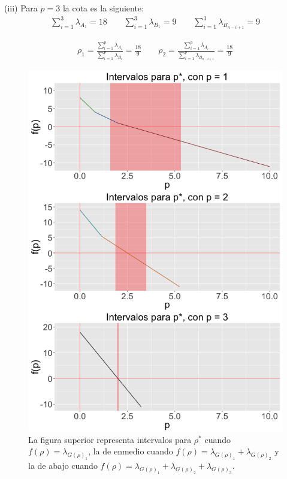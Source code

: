 \begin{example}
(iii) Para $p = 3$ la cota es la siguiente:
\begin{equation*}
  \begin{aligned}
  \sum_{i = 1}^{3}\lambda_{A_1}  = 18 \qquad
  \sum_{i = 1}^{3}\lambda_{B_1}  = 9 \qquad
  \sum_{i = 1}^{3}\lambda_{B_{n-i+1}}  = 9
  \end{aligned}
\end{equation*}

\begin{equation*}
  \begin{aligned}
\rho_1 = \frac{\sum_{i = 1}^{p}\lambda_{A_i}}{\sum_{i = 1}^{p}\lambda_{B_i}}  = \frac{18}{9} \qquad
\rho_2 = \frac{\sum_{i = 1}^{p}\lambda_{A_i}}{\sum_{i = 1}^{p}\lambda_{B_{n-i+1}}}  = \frac{18}{9}
  \end{aligned}
\end{equation*}

\end{example}

\begin{figure}[!ht] \label{Fig1.7}
  \centering
  \includegraphics[width=.9 \textwidth]{Figures/Chapter2_grid3eigen_interv2}  
  \caption[Intervalos para $\rho^*$. (Segunda cota)] {La figura superior representa intervalos para $\rho^*$ cuando $f(\rho) = \lambda_{G(\rho)_1}$, la de enmedio cuando $f(\rho) = \lambda_{G(\rho)_1} + \lambda_{G(\rho)_2}$ y la de abajo cuando $f(\rho) = \lambda_{G(\rho)_1} + \lambda_{G(\rho)_2} + \lambda_{G(\rho)_3}$.}
\end{figure}



